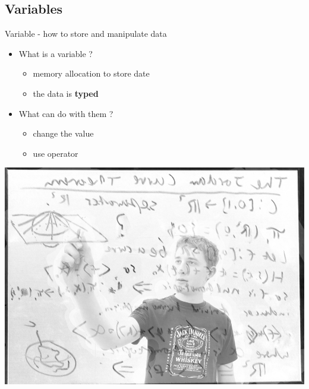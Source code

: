{  \subsection{Variables}
  \begin{frame}
    \begin{block}{Variable - how to store and manipulate data}
      \begin{itemize}
        \item What is a variable ?
        \begin{itemize}
          \item memory allocation to store date
          \item the data is \textbf{typed}
        \end{itemize}
        \item What can do with them ?
        \begin{itemize}
          \item change the value
          \item use operator
        \end{itemize}
      \end{itemize}
    \end{block}
    \begin{center}
      \includegraphics[scale=0.2]{img/variables.jpg}
    \end{center}
  \end{frame}

}
